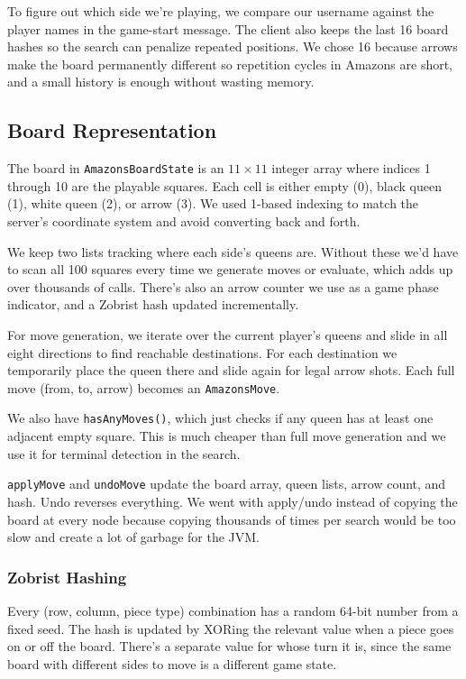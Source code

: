 \documentclass[12pt, letterpaper]{article}
\begin{document}
To figure out which side we're playing, we compare our username against the player names in the game-start message. The client also keeps the last 16 board hashes so the search can penalize repeated positions. We chose 16 because arrows make the board permanently different so repetition cycles in Amazons are short, and a small history is enough without wasting memory.

\subsection{Board Representation}

The board in \texttt{AmazonsBoardState} is an $11 \times 11$ integer array where indices 1 through 10 are the playable squares. Each cell is either empty (0), black queen (1), white queen (2), or arrow (3). We used 1-based indexing to match the server's coordinate system and avoid converting back and forth.

We keep two lists tracking where each side's queens are. Without these we'd have to scan all 100 squares every time we generate moves or evaluate, which adds up over thousands of calls. There's also an arrow counter we use as a game phase indicator, and a Zobrist hash updated incrementally.

For move generation, we iterate over the current player's queens and slide in all eight directions to find reachable destinations. For each destination we temporarily place the queen there and slide again for legal arrow shots. Each full move (from, to, arrow) becomes an \texttt{AmazonsMove}.

We also have \texttt{hasAnyMoves()}, which just checks if any queen has at least one adjacent empty square. This is much cheaper than full move generation and we use it for terminal detection in the search.

\texttt{applyMove} and \texttt{undoMove} update the board array, queen lists, arrow count, and hash. Undo reverses everything. We went with apply/undo instead of copying the board at every node because copying thousands of times per search would be too slow and create a lot of garbage for the JVM.

\subsubsection{Zobrist Hashing}

Every (row, column, piece type) combination has a random 64-bit number from a fixed seed. The hash is updated by XORing the relevant value when a piece goes on or off the board. There's a separate value for whose turn it is, since the same board with different sides to move is a different game state.
\end{document}
